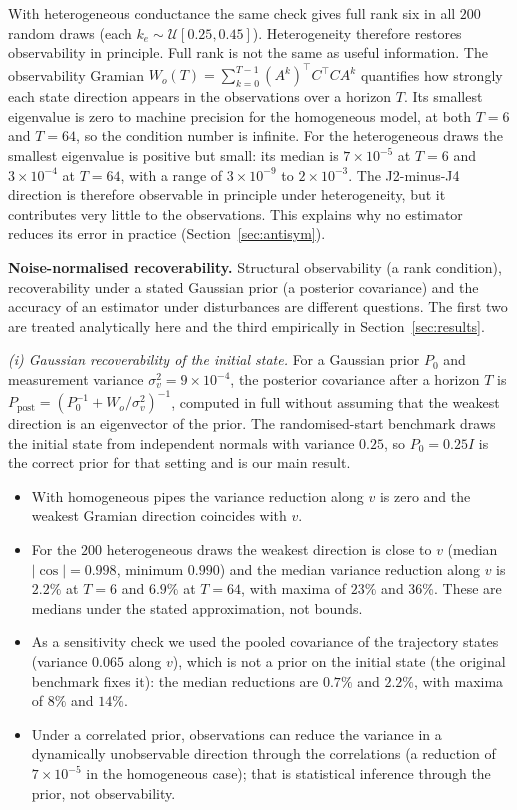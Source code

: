 \documentclass[conference]{IEEEtran}
\begin{document}
With heterogeneous conductance the same check gives full rank six in all $200$ random draws (each $k_e\sim\mathcal U[0.25,0.45]$). Heterogeneity therefore restores observability in principle. Full rank is not the same as useful information. The observability Gramian $W_o(T)=\sum_{k=0}^{T-1}(A^k)^\top C^\top CA^k$ quantifies how strongly each state direction appears in the observations over a horizon $T$. Its smallest eigenvalue is zero to machine precision for the homogeneous model, at both $T=6$ and $T=64$, so the condition number is infinite. For the heterogeneous draws the smallest eigenvalue is positive but small: its median is $7\times10^{-5}$ at $T=6$ and $3\times10^{-4}$ at $T=64$, with a range of $3\times10^{-9}$ to $2\times10^{-3}$. The J2-minus-J4 direction is therefore observable in principle under heterogeneity, but it contributes very little to the observations. This explains why no estimator reduces its error in practice (Section~\ref{sec:antisym}).

\textbf{Noise-normalised recoverability.} Structural observability (a rank condition), recoverability under a stated Gaussian prior (a posterior covariance) and the accuracy of an estimator under disturbances are different questions. The first two are treated analytically here and the third empirically in Section~\ref{sec:results}.

\emph{(i) Gaussian recoverability of the initial state.} For a Gaussian prior $P_0$ and measurement variance $\sigma_v^2=9\times10^{-4}$, the posterior covariance after a horizon $T$ is $P_{\text{post}}=(P_0^{-1}+W_o/\sigma_v^2)^{-1}$, computed in full without assuming that the weakest direction is an eigenvector of the prior. The randomised-start benchmark draws the initial state from independent normals with variance $0.25$, so $P_0=0.25I$ is the correct prior for that setting and is our main result.
\begin{itemize}
\item With homogeneous pipes the variance reduction along $v$ is zero and the weakest Gramian direction coincides with $v$.
\item For the $200$ heterogeneous draws the weakest direction is close to $v$ (median $|\cos|=0.998$, minimum $0.990$) and the median variance reduction along $v$ is $2.2\%$ at $T=6$ and $6.9\%$ at $T=64$, with maxima of $23\%$ and $36\%$. These are medians under the stated approximation, not bounds.
\item As a sensitivity check we used the pooled covariance of the trajectory states (variance $0.065$ along $v$), which is not a prior on the initial state (the original benchmark fixes it): the median reductions are $0.7\%$ and $2.2\%$, with maxima of $8\%$ and $14\%$.
\item Under a correlated prior, observations can reduce the variance in a dynamically unobservable direction through the correlations (a reduction of $7\times10^{-5}$ in the homogeneous case); that is statistical inference through the prior, not observability.
\end{itemize}
\end{document}
